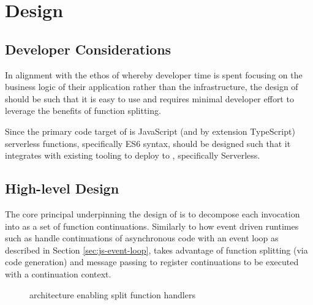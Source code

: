 \chapter{Design}

\section{Developer Considerations}
In alignment with the ethos of \faas{} whereby developer time is spent focusing on the business logic of their application rather than the infrastructure, the design of \faaasc{} should be such that it is easy to use and requires minimal developer effort to leverage the benefits of function splitting.

Since the primary code target of \faaasc{} is JavaScript (and by extension TypeScript) serverless functions, specifically ES6 syntax, \faaasc{} should be designed such that it integrates with existing tooling to deploy to \awslambda{}, specifically Serverless\cite{serverless-cli}.

\section{High-level Design}
The core principal underpinning the design of \faaas{} is to decompose each \faas{} invocation into as a set of function continuations. Similarly to how event driven runtimes such as \js{} handle continuations of asynchronous code with an event loop as described in Section \ref{sec:js-event-loop}, \faaas{} takes advantage of function splitting (via code generation) and message passing to register continuations to be executed with a continuation context.

\begin{figure}[htp]
    \centering
    \quad
    \caption{\faas{} architecture enabling split function handlers}
\end{figure}

